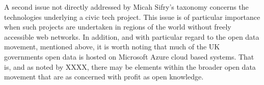 A second issue not directly addressed by Micah Sifry’s taxonomy concerns the technologies underlying a civic tech project. This issue is of particular importance when such projects are undertaken in regions of the world without freely accessible web networks.  In addition, and with particular regard to the open data movement, mentioned above, it is worth noting that much of the UK governments open data is hosted on Microsoft Azure cloud based systems. That is, and as noted by XXXX, there may be elements within the broader open data movement that are as concerned with profit as open knowledge. 